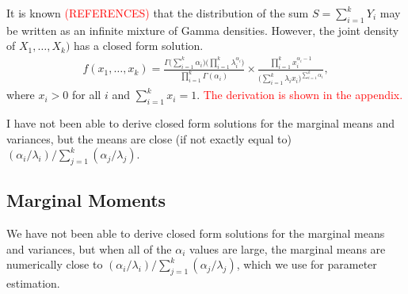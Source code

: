 \documentclass[ba]{imsart}
\numberwithin{equation}{section}
\theoremstyle{plain}
\newcommand{\falta}[1]{\textcolor{red}{#1}}
\begin{document}
It is known \falta{(REFERENCES)} that the distribution of the sum $S =
\sum_{i=1}^k Y_i$ may be written as an infinite mixture of Gamma
densities.  However, the joint density of $X_1,\ldots,X_k)$ has a
closed form solution.
\begin{align*}
f(x_1,\ldots,x_k) = \frac{\Gamma\big(\sum_{i=1}^k
  \alpha_i\big)\big(\prod_{i=1}^k
  \lambda_i^{\alpha_i}\big)}{\prod_{i=1}^k \Gamma(\alpha_i)} \times
\frac{\prod_{i=1}^k x_i^{\alpha_i - 1}}{\big(\sum_{i=1}^k \lambda_i
  x_i\big)^{\sum_{i=1}^k \alpha_i}},
\end{align*}
where $x_i > 0$ for all $i$ and $\sum_{i=1}^k x_i = 1$.
\falta{The derivation is shown in the appendix.}

I have not been able to derive closed form solutions for the marginal
means and variances, but the means are close (if not exactly equal to)
$(\alpha_i/\lambda_i) \big/ \sum_{j=1}^k (\alpha_j/\lambda_j)$.

\subsection{Marginal Moments}

We have not been able to derive closed form solutions for the marginal means and variances,
but when all of the $\alpha_i$ values are large,
the marginal means are numerically close to $(\alpha_i/\lambda_i) \big/ \sum_{j=1}^k (\alpha_j/\lambda_j)$,
which we use for parameter estimation.
\end{document}
